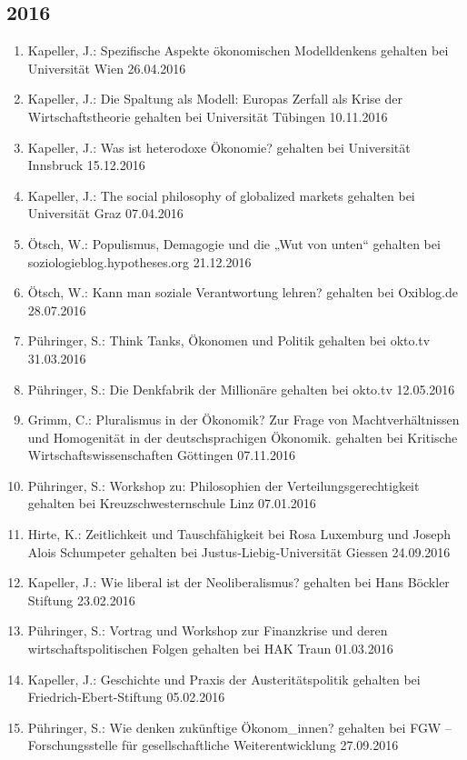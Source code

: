 \subsection*{2016}
\begin{enumerate}
	\item Kapeller, J.: Spezifische Aspekte ökonomischen Modelldenkens gehalten bei Universität Wien 26.04.2016
	\item Kapeller, J.: Die Spaltung als Modell: Europas Zerfall als Krise der Wirtschaftstheorie gehalten bei Universität Tübingen 10.11.2016
	\item Kapeller, J.: Was ist heterodoxe Ökonomie? gehalten bei Universität Innsbruck 15.12.2016
	\item Kapeller, J.: The social philosophy of globalized markets gehalten bei Universität Graz 07.04.2016
	\item Ötsch, W.: Populismus, Demagogie und die „Wut von unten“ gehalten bei soziologieblog.hypotheses.org 21.12.2016
	\item Ötsch, W.: Kann man soziale Verantwortung lehren? gehalten bei Oxiblog.de 28.07.2016
	\item Pühringer, S.: Think Tanks, Ökonomen und Politik gehalten bei okto.tv 31.03.2016
	\item Pühringer, S.: Die Denkfabrik der Millionäre gehalten bei okto.tv 12.05.2016
	\item Grimm, C.: Pluralismus in der Ökonomik? Zur Frage von Machtverhältnissen und Homogenität in der deutschsprachigen Ökonomik. gehalten bei Kritische Wirtschaftswissenschaften Göttingen 07.11.2016
	\item Pühringer, S.: Workshop zu: Philosophien der Verteilungsgerechtigkeit gehalten bei Kreuzschwesternschule Linz 07.01.2016
	\item Hirte, K.: Zeitlichkeit und Tauschfähigkeit bei Rosa Luxemburg und Joseph Alois Schumpeter gehalten bei Justus‐Liebig‐Universität Giessen 24.09.2016
	\item Kapeller, J.: Wie liberal ist der Neoliberalismus? gehalten bei Hans Böckler Stiftung 23.02.2016
	\item Pühringer, S.: Vortrag und Workshop zur Finanzkrise und deren wirtschaftspolitischen Folgen gehalten bei HAK Traun 01.03.2016
	\item Kapeller, J.: Geschichte und Praxis der Austeritätspolitik gehalten bei Friedrich-Ebert-Stiftung 05.02.2016
	\item Pühringer, S.: Wie denken zukünftige Ökonom\_innen? gehalten bei FGW -- Forschungsstelle für gesellschaftliche Weiterentwicklung 27.09.2016

\end{enumerate}
